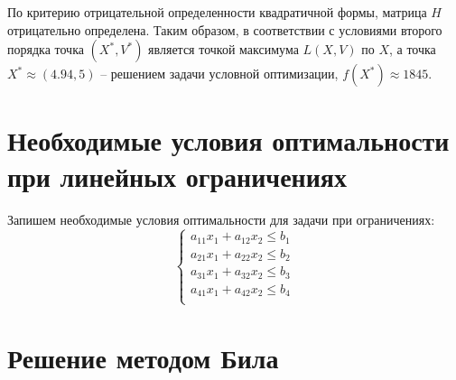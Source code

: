По критерию отрицательной определенности квадратичной формы, матрица $H$ отрицательно определена. Таким образом, в соответствии с условиями второго порядка точка $(X^*, V^*)$ является точкой максимума $L(X, V)$ по $X$, а точка $X^* \approx (4.94, 5)$ -- решением задачи условной оптимизации, $f(X^*) \approx 1845$. 

\section{Необходимые условия оптимальности при линейных ограничениях}

Запишем необходимые условия оптимальности для задачи при ограничениях:
\begin{equation*}
\begin{cases}
a_{11} x_1 + a_{12} x_2 \leq b_1 \\
a_{21} x_1 + a_{22} x_2 \leq b_2 \\
a_{31} x_1 + a_{32} x_2 \leq b_3 \\
a_{41} x_1 + a_{42} x_2 \leq b_4 \\
\end{cases}
\end{equation*}

\section{Решение методом Била}

